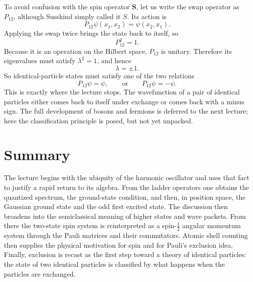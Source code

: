 To avoid confusion with the spin operator \(\mathbf{S}\), let us write the swap operator as \(P_{12}\), although Susskind simply called it \(S\). Its action is
\begin{equation}
P_{12}\psi(x_{1},x_{2})=\psi(x_{2},x_{1}).
\end{equation}
Applying the swap twice brings the state back to itself, so
\begin{equation}
P_{12}^{2}=1.
\end{equation}
Because it is an operation on the Hilbert space, \(P_{12}\) is unitary. Therefore its eigenvalues must satisfy \(\lambda^{2}=1\), and hence
\begin{equation}
\lambda=\pm 1.
\end{equation}
So identical-particle states must satisfy one of the two relations
\begin{equation}
P_{12}\psi=\psi,
\qquad\text{or}\qquad
P_{12}\psi=-\psi.
\end{equation}
This is exactly where the lecture stops. The wavefunction of a pair of identical particles either comes back to itself under exchange or comes back with a minus sign. The full development of bosons and fermions is deferred to the next lecture; here the classification principle is posed, but not yet unpacked.

\section{Summary}

The lecture begins with the ubiquity of the harmonic oscillator and uses that fact to justify a rapid return to its algebra. From the ladder operators one obtains the quantized spectrum, the ground-state condition, and then, in position space, the Gaussian ground state and the odd first excited state. The discussion then broadens into the semiclassical meaning of higher states and wave packets. From there the two-state spin system is reinterpreted as a spin-\(\tfrac12\) angular momentum system through the Pauli matrices and their commutators. Atomic shell counting then supplies the physical motivation for spin and for Pauli's exclusion idea. Finally, exclusion is recast as the first step toward a theory of identical particles: the state of two identical particles is classified by what happens when the particles are exchanged.